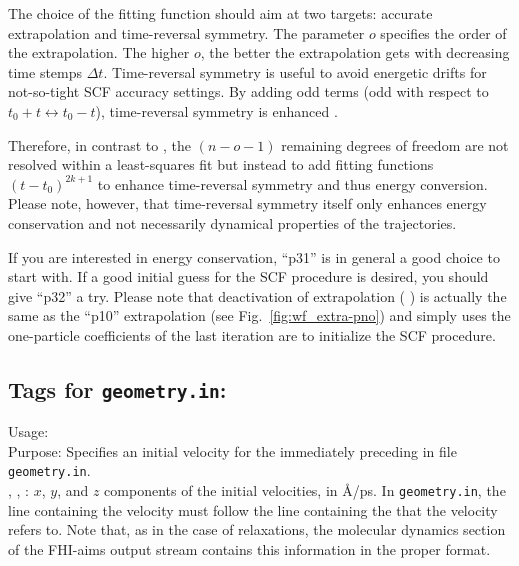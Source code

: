 The choice of the fitting function should aim at two targets: accurate
extrapolation and time-reversal symmetry.  The parameter $o$ specifies the
order of the extrapolation.  The higher $o$, the better the extrapolation gets
with decreasing time stemps $\Delta t$.  Time-reversal symmetry is useful to
avoid energetic drifts for not-so-tight SCF accuracy settings.  By adding odd
terms (odd with respect to $t_0+t \leftrightarrow t_0-t$), time-reversal
symmetry is enhanced \cite{Kolafa96-HOTR}.

Therefore, in contrast to \cite{Pulay04-FMD,Herbert-HG05-FMD}, the $(n-o-1)$
remaining degrees of freedom are not resolved within a least-squares fit but
instead to add fitting functions $(t-t_0)^{2k+1}$ to enhance time-reversal
symmetry and thus energy conversion.  Please note, however, that time-reversal
symmetry itself only enhances energy conservation and not necessarily
dynamical properties of the trajectories.

If you are interested in energy conservation, ``p31'' is in general a good
choice to start with.  If a good initial guess for the SCF procedure is
desired, you should give ``p32'' a try.  Please note that deactivation of
extrapolation ( ) is actually the same
as the ``p10'' extrapolation (see Fig.~\ref{fig:wf_extra-pno}) and simply uses
the one-particle coefficients of the last iteration are to initialize the SCF
procedure.



\subsection*{Tags for \texttt{geometry.in}:}

{	\noindent
  Usage:     \\[1.0ex]
  Purpose: Specifies an initial velocity for the immediately preceding
     in file \texttt{geometry.in}. \\[1.0ex]
  , ,  : $x$, $y$, and $z$ components
    of the initial velocities, in \AA/ps. 
}
In \texttt{geometry.in}, the line containing the velocity must follow
the line containing the  that the velocity refers
to. Note that, as in the case of relaxations, the molecular dynamics
section of the FHI-aims output stream contains this information in the
proper format.

\newpage

